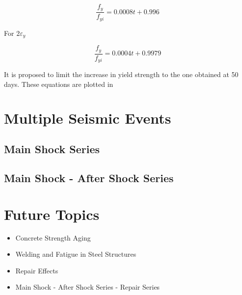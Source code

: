 \begin{equation}
  \frac{f_y}{f_{yi}}=0.0008t+0.996
  \label{eq.thirteen}
\end{equation} 

For $2\varepsilon_y$

\begin{equation}
  \frac{f_y}{f_{yi}}=0.0004t+0.9979
  \label{eq.fourteen}
\end{equation} 

It is proposed to limit the increase in yield strength to the one obtained at 50 days. These equations are plotted in 


\section{Multiple Seismic Events}

\subsection{Main Shock Series}

\subsection{Main Shock - After Shock Series}

\section{Future Topics}

\begin{itemize}
	\item Concrete Strength Aging
	\item Welding and Fatigue in Steel Structures
	\item Repair Effects
	\item Main Shock - After Shock Series - Repair Series
\end{itemize}
